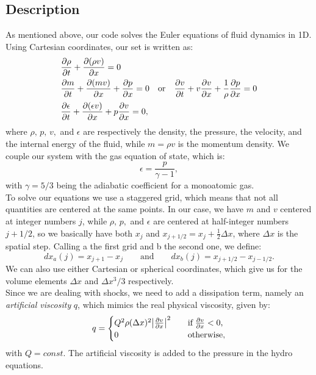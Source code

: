 \documentclass{article}
\begin{document}
\subsection{Description}
As mentioned above, our code solves the Euler equations of fluid dynamics in 1D. Using Cartesian coordinates, our set is written as:
\begin{align}
	&\pdv{\rho}{t}+\pdv{(\rho v)}{x}=0 \label{eoc}\\
	&\pdv{m}{t}+\pdv{(mv)}{x}+\pdv{p}{x}=0\quad\text{or}\quad\pdv{v}{t}+v\pdv{v}{x}+\frac{1}{\rho}\pdv{p}{x}=0 \label{eom}\\
	&\pdv{\epsilon}{t}+\pdv{(\epsilon v)}{x}+p\pdv{v}{x}=0,\label{eoe}
\end{align}
where $\rho,\, p,\, v,$ and $\epsilon$ are respectively the density, the pressure, the velocity, and the internal energy of the fluid, while $m=\rho v$ is the momentum density. We couple our system with the gas equation of state, which is:
\begin{equation}
	\epsilon=\frac{p}{\gamma -1},
\end{equation}
with $\gamma=5/3$ being the adiabatic coefficient for a monoatomic gas.\\
To solve our equations we use a staggered grid, which means that not all quantities are centered at the same points. In our case, we have $m$ and $v$ centered at integer numbers $j$, while $\rho,\,p,$ and $\epsilon$ are centered at half-integer numbers $j+1/2$, so we basically have both $x_{j}$ and $x_{j+1/2}=x_{j}+\frac{1}{2}\Delta x$, where $\Delta x$ is the spatial step. 
Calling a the first grid and b the second one, we define:
\begin{equation*}
	dx_a(j)=x_{j+1}-x_{j} \qquad \text{and} \qquad dx_b(j)=x_{j+1/2}-x_{j-1/2}.
\end{equation*}
We can also use either Cartesian or spherical coordinates, which give us for the volume elements $\Delta x$ and $\Delta x^3/3$ respectively.\\
Since we are dealing with shocks, we need to add a dissipation term, namely an \textit{artificial viscosity} $q$, which mimics the real physical viscosity, given by:
\begin{equation}
	q=
	\begin{cases}
		Q^2 \rho(\Delta x)^2 \abs{\pdv{v}{x}}^2\quad &\text{if} \; \pdv{v}{x}<0,\\
		0 \quad &\text{otherwise},
	\end{cases}
\end{equation} 
with $Q=const$. The artificial viscosity is added to the pressure in the hydro equations.\\
\end{document}
